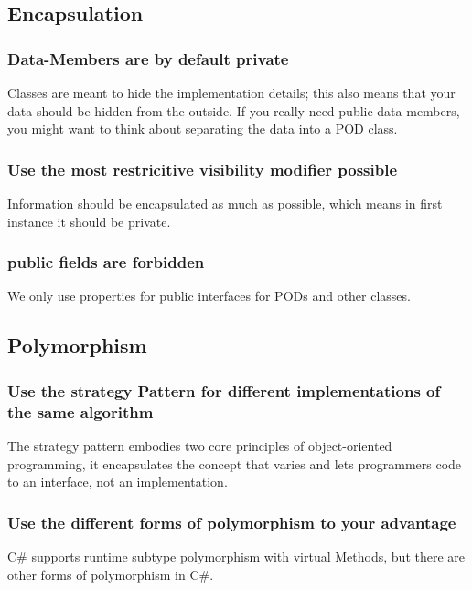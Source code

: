 \documentclass[11pt,a4paper]{article}
\begin{document}
\subsection{Encapsulation}

\subsubsection{Data-Members are by default private}

Classes are meant to hide the implementation details; this also means that your data should be hidden from the outside. If you really need public data-members, you might want to think about separating the data into a POD class.

\subsubsection{Use the most restricitive visibility modifier possible}

Information should be encapsulated as much as possible, which means in first instance it should be private.

\subsubsection{public fields are forbidden}

We only use properties for public interfaces for PODs and other classes.

\subsection{Polymorphism}

\subsubsection{Use the strategy Pattern for different implementations of the same algorithm}

The strategy pattern embodies two core principles of object-oriented programming, it encapsulates the concept that varies and lets programmers code to an interface, not an implementation.

\subsubsection{Use the different forms of polymorphism to your advantage}

C\# supports runtime subtype polymorphism with virtual Methods, but there are other forms of polymorphism in C\#.
\end{document}
